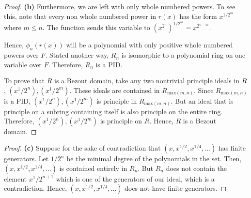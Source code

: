 \documentclass[10pt]{article}
\newenvironment{problem}[2][Problem]{\begin{trivlist}
		\item[\hskip \labelsep {\bfseries #1}\hskip \labelsep {\bfseries #2.}]}{\end{trivlist}}
\begin{document}
\begin{problem}{2.12}
\begin{proof}{\textbf{(b)}}
			Furthermore, we are left with only whole numbered powers. To see this, note that every non whole numbered power in $r(x)$ has the form $x^{1/2^m}$ where $m \leq n$. The function sends this variable to $(x^{2^n})^{1/2^m} = x^{2^{n-m}}$.
			
			Hence, $\phi_n(r(x))$ will be a polynomial with only positive whole numbered powers over $F$. Stated another way, $R_n$ is isomorphic to a polynomial ring on one variable over $F$. Therefore, $R_n$ is a PID.
			
			To prove that $R$ is a Bezout domain, take any two nontrivial principle ideals in $R$, $(x^1/2^n), (x^1/2^m)$. These ideals are contained in $R_{\text{max}(m,n)}$. Since $R_{\text{max}(m,n)}$ is a PID, $(x^1/2^n), (x^1/2^m)$ is principle in $R_{\text{max}(m,n)}$. But an ideal that is principle on a subring containing itself is also principle on the entire ring. Therefore, $(x^1/2^n), (x^1/2^m)$ is principle on $R$. Hence, $R$ is a Bezout domain.
		\end{proof}
		
		\begin{proof}{\textbf{(c)}}
			Suppose for the sake of contradiction that $(x, x^{1/2}, x^{1/4}, ...)$ has finite generators. Let $1/2^n$ be the minimal degree of the polynomials in the set. Then, $(x, x^{1/2}, x^{1/4}, ...)$ is contained entirely in $R_n$. But $R_n$ does not contain the element $x^1/2^{n+1}$ which is one of the generators of our ideal, which is a contradiction. Hence, $(x, x^{1/2}, x^{1/4}, ...)$ does not have finite generators.
		\end{proof}
	\end{problem}
	
\end{document}
